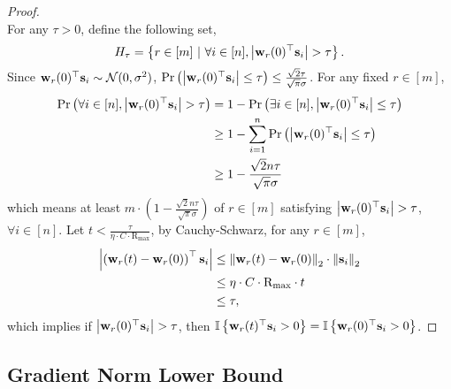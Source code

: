\documentclass[10pt]{article}
\begin{document}
\begin{proof}
\begin{equation*}
\end{equation*}
For any $\tau > 0$, define the following set,
\begin{equation*}
	H_\tau = \left\{ r \in [m] \ | \ \forall i \in [n], \left| {\mathbf{w}}_r(0)^\top {\mathbf{s}}_i \right| > \tau \right\}.
\end{equation*}
Since ${\mathbf{w}}_r(0)^\top {\mathbf{s}}_i \sim {\mathcal{N}}(0, \sigma^2)$, ${\text{Pr}}\left(\left| {\mathbf{w}}_r(0)^\top {\mathbf{s}}_i \right| \le \tau\right) \le \frac{\sqrt{2}\tau}{\sqrt{\pi}\sigma}$. For any fixed $r \in [m]$,
\begin{equation*}
\begin{split}
	{\text{Pr}}\left(\forall i \in [n], \left| {\mathbf{w}}_r(0)^\top {\mathbf{s}}_i \right| > \tau\right) &= 1 - {\text{Pr}}\left(\exists i \in [n], \left| {\mathbf{w}}_r(0)^\top {\mathbf{s}}_i \right| \le \tau\right) \\
	&\ge 1 - \sum\limits_{i=1}^{n}{ {\text{Pr}}\left(\left| {\mathbf{w}}_r(0)^\top {\mathbf{s}}_i \right| \le \tau\right) } \\
	&\ge 1 - \frac{\sqrt{2} n\tau}{\sqrt{\pi}\sigma}
\end{split}
\end{equation*}
which means at least $m \cdot \left( 1 - \frac{\sqrt{2}n\tau}{\sqrt{\pi}\sigma} \right)$   of $r \in [m]$ satisfying $\left| {\mathbf{w}}_r(0)^\top {\mathbf{s}}_i \right| > \tau$, $\forall i \in [n]$. Let $t < \frac{\tau}{ \eta \cdot C \cdot \text{R}_{\max} }$, by Cauchy-Schwarz, for any $r \in [m]$,
\begin{equation*}
\begin{split}
	\left| \left( {\mathbf{w}}_r(t) - {\mathbf{w}}_r(0) \right)^\top {\mathbf{s}}_i \right| &\le \left\| {\mathbf{w}}_r(t) - {\mathbf{w}}_r(0) \right\|_2 \cdot \left\| {\mathbf{s}}_i \right\|_2 \\
	&\le \eta \cdot C \cdot \text{R}_{\max} \cdot t \\
	&\le \tau,
\end{split}
\end{equation*}
which implies if $\left| {\mathbf{w}}_r(0)^\top {\mathbf{s}}_i \right| > \tau$, then ${\mathbb{I}}\left\{ {\mathbf{w}}_r(t)^\top {\mathbf{s}}_i > 0 \right\} = {\mathbb{I}}\left\{ {\mathbf{w}}_r(0)^\top {\mathbf{s}}_i > 0 \right\}$.
\end{proof}

\subsection{Gradient Norm Lower Bound}
\end{document}
